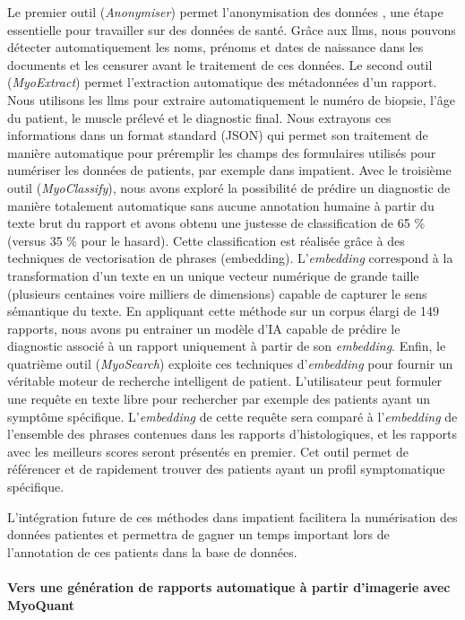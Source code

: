 Le premier outil (\textit{Anonymiser}) permet l’anonymisation des données , une étape essentielle pour travailler sur des données de santé. Grâce aux \gls{llms}, nous pouvons détecter automatiquement les noms, prénoms et dates de naissance dans les documents et les censurer avant le traitement de ces données. Le second outil (\textit{MyoExtract}) permet l’extraction automatique des métadonnées d’un rapport. Nous utilisons les \gls{llms} pour extraire automatiquement le numéro de biopsie, l’âge du patient, le muscle prélevé et le diagnostic final. Nous extrayons ces informations dans un format standard (JSON) qui permet son traitement de manière automatique pour préremplir les champs des formulaires utilisés pour numériser les données de patients, par exemple dans \gls{impatient}. Avec le troisième outil (\textit{MyoClassify}), nous avons exploré la possibilité de prédire un diagnostic de manière totalement automatique sans aucune annotation humaine à partir du texte brut du rapport et avons obtenu une justesse de classification de 65 \% (versus 35 \% pour le hasard). Cette classification est réalisée grâce à des techniques de vectorisation de phrases (embedding). L’\textit{embedding} correspond à la transformation d’un texte en un unique vecteur numérique de grande taille (plusieurs centaines voire milliers de dimensions) capable de capturer le sens sémantique du texte. En appliquant cette méthode sur un corpus élargi de 149 rapports, nous avons pu entrainer un modèle d’IA capable de prédire le diagnostic associé à un rapport uniquement à partir de son \textit{embedding}. Enfin, le quatrième outil (\textit{MyoSearch}) exploite ces techniques d’\textit{embedding} pour fournir un véritable moteur de recherche intelligent de patient. L’utilisateur peut formuler une requête en texte libre pour rechercher par exemple des patients ayant un symptôme spécifique. L’\textit{embedding} de cette requête sera comparé à l’\textit{embedding} de l’ensemble des phrases contenues dans les rapports d’histologiques, et les rapports avec les meilleurs scores seront présentés en premier. Cet outil permet de référencer et de rapidement trouver des patients ayant un profil symptomatique spécifique.

L’intégration future de ces méthodes dans \gls{impatient} facilitera la numérisation des données patientes et permettra de gagner un temps important lors de l’annotation de ces patients dans la base de données.

\paragraph{\textbf{Vers une génération de rapports automatique à partir d’imagerie avec MyoQuant}}\mbox{}\\

